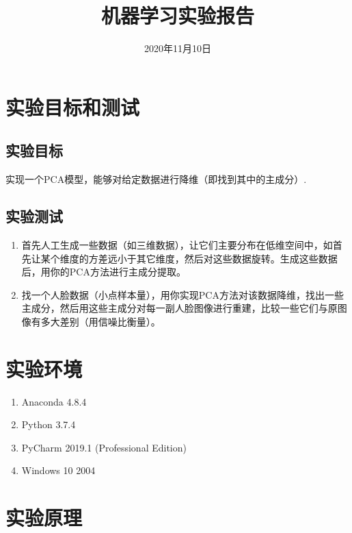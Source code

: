 \documentclass{hitreport}
\title{机器学习实验报告}
\date{2020年11月10日}
\begin{document}
\maketitle

\tableofcontents
\newpage




\section{实验目标和测试}

\subsection{实验目标}

实现一个PCA模型，能够对给定数据进行降维（即找到其中的主成分）.

\subsection{实验测试}
\begin{enumerate}
\item 首先人工生成一些数据（如三维数据），让它们主要分布在低维空间中，如首先让某个维度的方差远小于其它维度，然后对这些数据旋转。生成这些数据后，用你的PCA方法进行主成分提取。
\item 找一个人脸数据（小点样本量），用你实现PCA方法对该数据降维，找出一些主成分，然后用这些主成分对每一副人脸图像进行重建，比较一些它们与原图像有多大差别（用信噪比衡量）。

\end{enumerate}

\section{实验环境}

\begin{enumerate}
\item Anaconda 4.8.4
\item Python 3.7.4
\item PyCharm 2019.1 (Professional Edition)
\item Windows 10 2004
\end{enumerate}

\section{实验原理}
\end{document}
